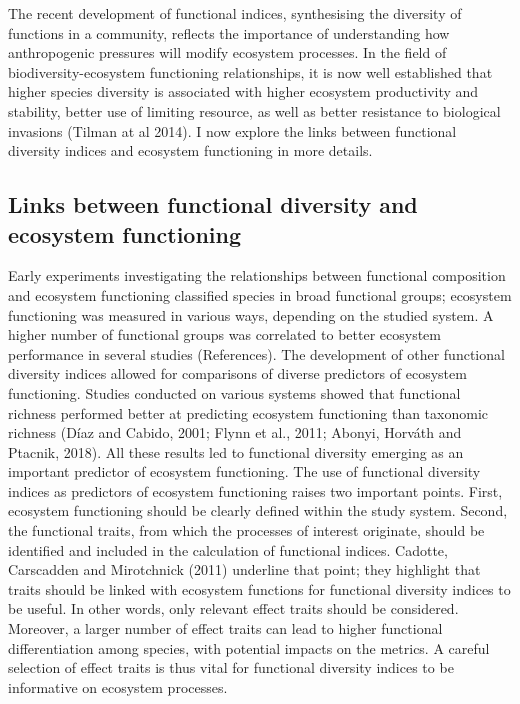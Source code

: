 The recent development of functional indices, synthesising the diversity of functions in a community, reflects the importance of understanding how anthropogenic pressures will modify ecosystem processes. In the field of biodiversity-ecosystem functioning relationships, it is now well established that higher species diversity is associated with higher ecosystem productivity and stability, better use of limiting resource, as well as better resistance to biological invasions (Tilman at al 2014). I now explore the links between functional diversity indices and ecosystem functioning in more details.

\subsection{Links between functional diversity and ecosystem functioning}
Early experiments investigating the relationships between functional composition and ecosystem functioning classified species in broad functional groups; ecosystem functioning was measured in various ways, depending on the studied system. A higher number of functional groups was correlated to better ecosystem performance in several studies (References). The development of other functional diversity indices allowed for comparisons of diverse predictors of ecosystem functioning. Studies conducted on various systems showed that functional richness performed better at predicting ecosystem functioning than taxonomic richness (Díaz and Cabido, 2001; Flynn et al., 2011; Abonyi, Horváth and Ptacnik, 2018). All these results led to functional diversity emerging as an important predictor of ecosystem functioning. 
The use of functional diversity indices as predictors of ecosystem functioning raises two important points. First, ecosystem functioning should be clearly defined within the study system. Second, the functional traits, from which the processes of interest originate, should be identified and included in the calculation of functional indices. Cadotte, Carscadden and Mirotchnick (2011) underline that point; they highlight that traits should be linked with ecosystem functions for functional diversity indices to be useful. In other words, only relevant effect traits should be considered. Moreover, a larger number of effect traits can lead to higher functional differentiation among species, with potential impacts on the metrics. A careful selection of effect traits is thus vital for functional diversity indices to be informative on ecosystem processes.
